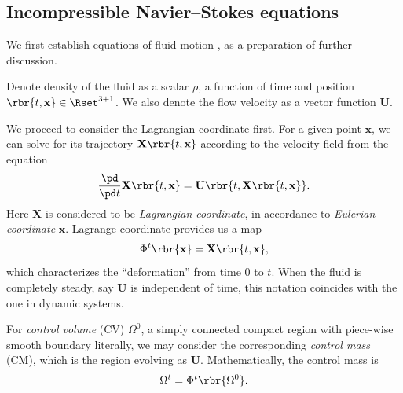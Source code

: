 \documentclass[english, nochinese]{pkupaper}
\begin{document}
\subsection{Incompressible Navier--Stokes equations}

We first establish equations of fluid motion \parencite{pope_turbulent_2001} \parencite{ferziger_computational_2002}, as a preparation of further discussion.

Denote density of the fluid as a scalar $\rho$, a function of time and position $ \rbr{ t, \mathbf{x} } \in \Rset^{ 3 + 1 } $. We also denote the flow velocity as a vector function $\mathbf{U}$.

We proceed to consider the Lagrangian coordinate first. For a given point $\mathbf{x}$, we can solve for its trajectory $ \mathbf{X} \rbr{ t, \mathbf{x} } $ according to the velocity field from the equation
\begin{equation}
\frac{\pd}{ \pd t } \mathbf{X} \rbr{ t, \mathbf{x} } = \mathbf{U} \rbr{ t, \mathbf{X} \rbr{ t, \mathbf{x} } }.
\end{equation}
Here $\mathbf{X}$ is considered to be \emph{Lagrangian coordinate}, in accordance to \emph{Eulerian coordinate} $\mathbf{x}$. Lagrange coordinate provides us a map
\begin{equation}
\Phi^t \rbr{\mathbf{x}} = \mathbf{X} \rbr{ t, \mathbf{x} },
\end{equation}
which characterizes the ``deformation'' from time $0$ to $t$. When the fluid is completely steady, say $\mathbf{U}$ is independent of time, this notation coincides with the one in dynamic systems.

For \emph{control volume} (CV) $\Omega^0$, a simply connected compact region with piece-wise smooth boundary literally, we may consider the corresponding \emph{control mass} (CM), which is the region evolving as $\mathbf{U}$. Mathematically, the control mass is
\begin{equation}
\Omega^t = \Phi^t \rbr{\Omega^0}.
\end{equation}
\end{document}
